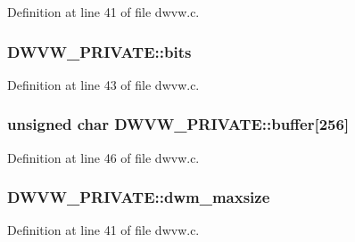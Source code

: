 Definition at line 41 of file dwvw.\+c.

\subsubsection[{\texorpdfstring{bits}{bits}}]{ D\+W\+V\+W\+\_\+\+P\+R\+I\+V\+A\+T\+E\+::bits}\hypertarget{struct_d_w_v_w___p_r_i_v_a_t_e_a160ef4d374979683ae4132f093f47552}{}\label{struct_d_w_v_w___p_r_i_v_a_t_e_a160ef4d374979683ae4132f093f47552}


Definition at line 43 of file dwvw.\+c.

\subsubsection[{\texorpdfstring{buffer}{buffer}}]{\setlength{\rightskip}{0pt plus 5cm}unsigned char D\+W\+V\+W\+\_\+\+P\+R\+I\+V\+A\+T\+E\+::buffer\mbox{[}256\mbox{]}}\hypertarget{struct_d_w_v_w___p_r_i_v_a_t_e_a45832e24e4f37217252e676499dbde40}{}\label{struct_d_w_v_w___p_r_i_v_a_t_e_a45832e24e4f37217252e676499dbde40}


Definition at line 46 of file dwvw.\+c.

\subsubsection[{\texorpdfstring{dwm\+\_\+maxsize}{dwm_maxsize}}]{ D\+W\+V\+W\+\_\+\+P\+R\+I\+V\+A\+T\+E\+::dwm\+\_\+maxsize}\hypertarget{struct_d_w_v_w___p_r_i_v_a_t_e_a95dce51766d3f243a6c99c3bcd2f18a2}{}\label{struct_d_w_v_w___p_r_i_v_a_t_e_a95dce51766d3f243a6c99c3bcd2f18a2}


Definition at line 41 of file dwvw.\+c.

